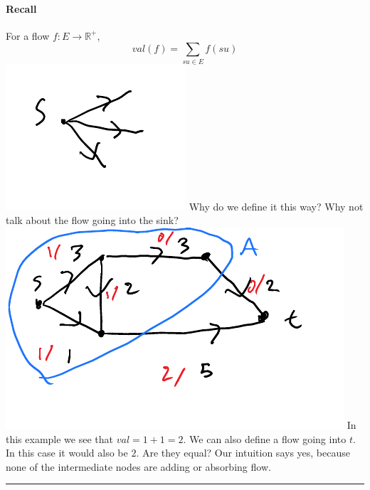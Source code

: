 \documentclass[12 pt]{article}
\begin{document}
        \paragraph{Recall} For a flow $f:E \to \mathbb{R}^+$,
        $$val(f) = \sum_{su\in E} f(su)$$
        \includegraphics[width=.7\textwidth]{i23.pdf}
        Why do we define it this way? Why not talk about the flow
        going into the sink?
        \\ \includegraphics[width=.7\textwidth]{i24.pdf}
        In this example we see that $val=1+1=2$. We can also define a
        flow going into $t$. In this case it would also be $2$. Are
        they equal? Our intuition says yes, because none of the
        intermediate nodes are adding or absorbing flow.
        \\ \rule{\textwidth}{0.5pt}
\end{document}

